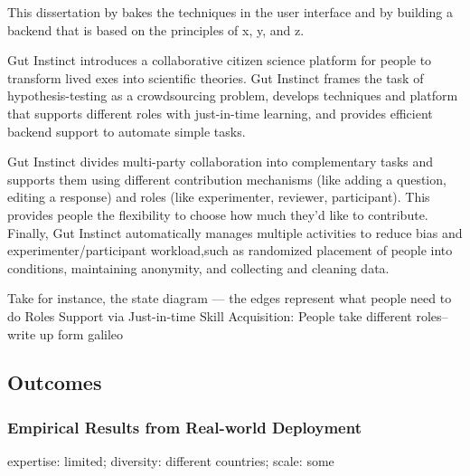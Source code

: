 This dissertation by bakes the techniques in the user interface  and by building a backend that is based on the principles of x, y, and z.

Gut Instinct  introduces a collaborative citizen science platform for people to transform lived exes into scientific theories. Gut Instinct frames the task of hypothesis-testing as a crowdsourcing problem, develops techniques and platform that supports different roles with just-in-time learning, and provides efficient backend support to automate simple tasks.

Gut Instinct divides multi-party collaboration into complementary tasks and supports them using different contribution mechanisms (like adding a question, editing a response) and roles (like experimenter, reviewer, participant). This provides people the flexibility to choose how much they’d like to contribute. Finally, Gut Instinct automatically manages multiple activities to reduce 
bias and experimenter/participant workload,such as randomized placement of 
people into conditions, maintaining anonymity, and collecting and cleaning data.


Take for instance, the state diagram — the edges represent what people need to do 
Roles Support via Just-in-time Skill Acquisition:  People take different roles--write up form galileo


\subsection{Outcomes}
\subsubsection{Empirical Results from Real-world Deployment}
expertise: limited; diversity: different countries; scale: some

